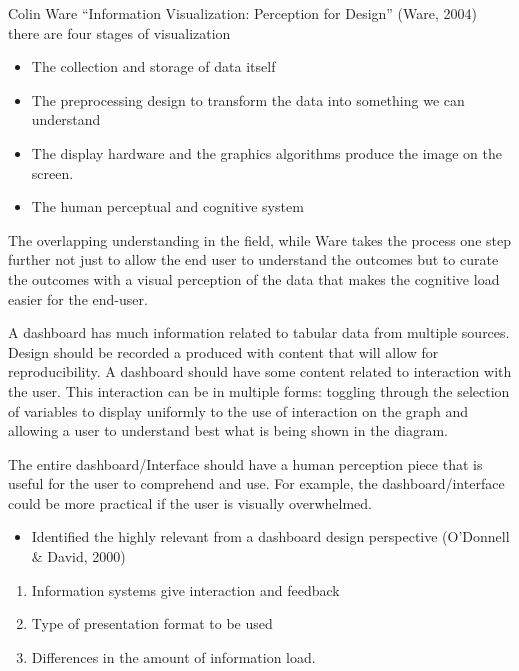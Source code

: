 \documentclass[print]{nuthesis}
\providecommand{\tightlist}{%
  \setlength{\itemsep}{0pt}\setlength{\parskip}{0pt}}
\begin{document}
Colin Ware ``Information Visualization: Perception for Design'' (Ware, 2004) there are four stages of visualization

\begin{itemize}
\tightlist
\item
  The collection and storage of data itself
\item
  The preprocessing design to transform the data into something we can understand
\item
  The display hardware and the graphics algorithms produce the image on the screen.
\item
  The human perceptual and cognitive system
\end{itemize}

The overlapping understanding in the field, while Ware takes the process one step further not just to allow the end user to understand the outcomes but to curate the outcomes with a visual perception of the data that makes the cognitive load easier for the end-user.

A dashboard has much information related to tabular data from multiple sources. Design should be recorded a produced with content that will allow for reproducibility. A dashboard should have some content related to interaction with the user. This interaction can be in multiple forms: toggling through the selection of variables to display uniformly to the use of interaction on the graph and allowing a user to understand best what is being shown in the diagram.

The entire dashboard/Interface should have a human perception piece that is useful for the user to comprehend and use. For example, the dashboard/interface could be more practical if the user is visually overwhelmed.

\begin{itemize}
\tightlist
\item
  Identified the highly relevant from a dashboard design perspective (O'Donnell \& David, 2000)
\end{itemize}

\begin{enumerate}
\def\labelenumi{\arabic{enumi}.}
\tightlist
\item
  Information systems give interaction and feedback
\item
  Type of presentation format to be used
\item
  Differences in the amount of information load.
\end{enumerate}
\end{document}
